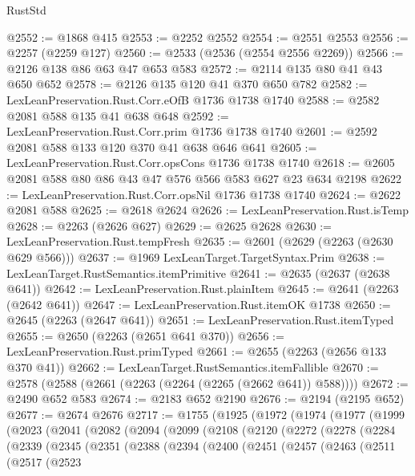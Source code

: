 \begin{lexlean}{RustStd}
\begin{coremodule}
{\begin{coremodule}
{{{{{{{{{{{{{{{@2552 := @1868 @415
@2553 := @2252 @2552
@2554 := @2551 @2553
@2556 := @2257 (@2259 @127)
@2560 := @2533 (@2536 (@2554 @2556 @2269))
@2566 := @2126 @138 @86 @63 @47 @653 @583
@2572 := @2114 @135 @80 @41 @43 @650 @652
@2578 := @2126 @135 @120 @41 @370 @650 @782
@2582 := LexLeanPreservation.Rust.Corr.eOfB @1736 @1738 @1740
@2588 := @2582 @2081 @588 @135 @41 @638 @648
@2592 := LexLeanPreservation.Rust.Corr.prim @1736 @1738 @1740
@2601 := @2592 @2081 @588 @133 @120 @370 @41 @638 @646 @641
@2605 := LexLeanPreservation.Rust.Corr.opsCons @1736 @1738 @1740
@2618 := @2605 @2081 @588 @80 @86 @43 @47 @576 @566 @583 @627 @23 @634 @2198
@2622 := LexLeanPreservation.Rust.Corr.opsNil @1736 @1738 @1740
@2624 := @2622 @2081 @588
@2625 := @2618 @2624
@2626 := LexLeanPreservation.Rust.isTemp
@2628 := @2263 (@2626 @627)
@2629 := @2625 @2628
@2630 := LexLeanPreservation.Rust.tempFresh
@2635 := @2601 (@2629 (@2263 (@2630 @629 @566)))
@2637 := @1969 LexLeanTarget.TargetSyntax.Prim
@2638 := LexLeanTarget.RustSemantics.itemPrimitive
@2641 := @2635 (@2637 (@2638 @641))
@2642 := LexLeanPreservation.Rust.plainItem
@2645 := @2641 (@2263 (@2642 @641))
@2647 := LexLeanPreservation.Rust.itemOK @1738
@2650 := @2645 (@2263 (@2647 @641))
@2651 := LexLeanPreservation.Rust.itemTyped
@2655 := @2650 (@2263 (@2651 @641 @370))
@2656 := LexLeanPreservation.Rust.primTyped
@2661 := @2655 (@2263 (@2656 @133 @370 @41))
@2662 := LexLeanTarget.RustSemantics.itemFallible
@2670 := @2578 (@2588 (@2661 (@2263 (@2264 (@2265 (@2662 @641)) @588))))
@2672 := @2490 @652 @583
@2674 := @2183 @652 @2190
@2676 := @2194 (@2195 @652)
@2677 := @2674 @2676
@2717 := @1755
    (@1925
      (@1972
        (@1974
          (@1977
            (@1999
              (@2023
                (@2041
                  (@2082
                    (@2094
                      (@2099
                        (@2108
                          (@2120
                            (@2272
                              (@2278
                                (@2284
                                  (@2339
                                    (@2345
                                      (@2351
                                        (@2388
                                          (@2394
                                            (@2400
                                              (@2451
                                                (@2457
                                                  (@2463
                                                    (@2511
                                                      (@2517
                                                        (@2523
}}}}}}}}}}}}}}}
\end{coremodule}}
\end{coremodule}
\end{lexlean}
